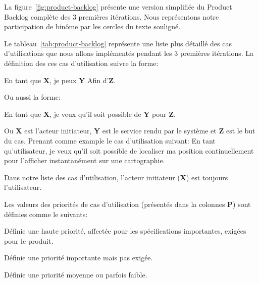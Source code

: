 La figure~\ref{fig:product-backlog} présente une version simplifiée du Product
Backlog complète des 3 premières itérations. Nous représentons notre
participation de binôme par les cercles du texte souligné.



Le tableau~\ref{tab:product-backlog} représente une liste plus détaillé des cas
d'utilisations que nous allons implémentés pendant les 3 premières itérations.
La définition des ces cas d'utilisation suivre la forme:

\begin{displayquote}
    En tant que \textbf{X}, je peux \textbf{Y} Afin d'\textbf{Z}.
\end{displayquote}

Ou aussi la forme:

\begin{displayquote}
    En tant que \textbf{X}, je veux qu'il soit possible de \textbf{Y} pour
    \textbf{Z}.
\end{displayquote}

Ou \textbf{X} est l'acteur initiateur, \textbf{Y} est le service rendu par le
système et \textbf{Z} est le but du cas. Prenant comme example le cas
d'utilisation suivant: En tant qu'utilisateur, je veux qu'il soit possible de
localiser ma position continuellement pour l'afficher instantanément sur une
cartographie.

Dans notre liste des cas d'utilisation, l'acteur initiateur (\textbf{X}) est
toujours l'utilisateur.

Les valeurs des priorités de cas d'utilisation (présentés dans la colonnes
\textbf{P}) sont définies comme le suivants:

\begin{description}[align=right,labelwidth=1cm]
    \item [1:] Définie une haute priorité, affectée pour les spécifications
        importantes, exigées pour le produit.
    \item [2:] Définie une priorité importante mais pas exigée.
    \item [3:] Définie une priorité moyenne ou parfois faible.
\end{description}

